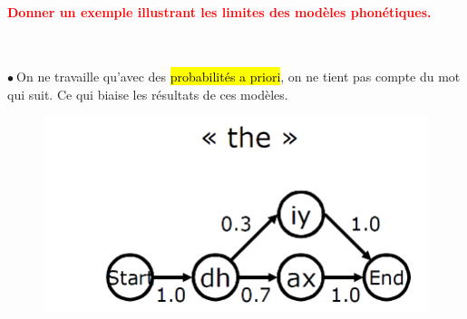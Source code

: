 \documentclass[letterpaper, 12pt]{article}
\newcommand{\red}[1]{
	\textcolor{red}{#1}
}
\newcommand{\point}{$\bullet\ $}
\begin{document}
		\paragraph{\red{Donner un exemple illustrant les limites des modèles phonétiques.}}~\\
			\begin{minipage}{0.66\textwidth}
				\point On ne travaille qu'avec des \hl{probabilit\'es a priori}, on ne tient pas compte du mot qui
				suit. Ce qui biaise les résultats de ces modèles.
			\end{minipage}\hfill
			\begin{minipage}{0.275\textwidth}
				\begin{figure}[H]
					\centering
					\includegraphics[scale=0.275]{Images/phonetic_markov}
				\end{figure}\noindent
			\end{minipage}
\end{document}
